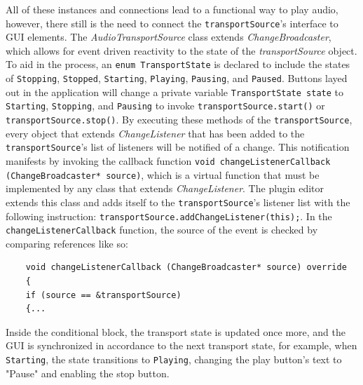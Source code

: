 \documentclass[12pt, a4paper, hidelinks]{article}
\begin{document}
	All of these instances and connections lead to a functional way to play audio, however, there still is the need to connect the \texttt{transportSource}'s interface to GUI elements. The \textit{AudioTransportSource} class extends \textit{ChangeBroadcaster}, which allows for event driven reactivity to the state of the \textit{transportSource} object. To aid in the process, an \texttt{enum TransportState} is declared to include the states of \texttt{Stopping}, \texttt{Stopped}, \texttt{Starting}, \texttt{Playing}, \texttt{Pausing}, and \texttt{Paused}. Buttons layed out in the application will change a private variable \texttt{TransportState state} to \texttt{Starting}, \texttt{Stopping}, and \texttt{Pausing} to invoke \texttt{transportSource.start()} or \texttt{transportSource.stop()}. By executing these methods of the \texttt{transportSource}, every object that extends \textit{ChangeListener} that has been added to the \texttt{transportSource}'s list of listeners will be notified of a change. This notification manifests by invoking the callback function \texttt{void changeListenerCallback (ChangeBroadcaster* source)}, which is a virtual function that must be implemented by any class that extends \textit{ChangeListener}. The plugin editor extends this class and adds itself to the \texttt{transportSource}'s listener list with the following instruction: \texttt{transportSource.addChangeListener(this);}. In the \texttt{changeListenerCallback} function, the source of the event is checked by comparing references like so:
	\begin{verbatim}
	void changeListenerCallback (ChangeBroadcaster* source) override
	{
	if (source == &transportSource)
	{...
	\end{verbatim}
	Inside the conditional block, the transport state is updated once more, and the GUI is synchronized in accordance to the next transport state, for example, when \texttt{Starting}, the state transitions to \texttt{Playing}, changing the play button's text to "Pause" and enabling the stop button. \par
	
	
	\newpage
\end{document}
